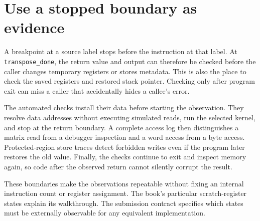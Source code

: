 \section{Use a stopped boundary as evidence}\label{transpose-p-boundaries}
A breakpoint at a source label stops before the instruction at that label. At
\texttt{transpose\_done}, the return value and output can therefore be checked
before the caller changes temporary registers or stores metadata. This is also
the place to check the saved registers and restored stack pointer. Checking only
after program exit can miss a caller that accidentally hides a callee's error.

The automated checks install their data before starting the observation. They
resolve data addresses without executing simulated reads, run the selected kernel,
and stop at the return boundary. A complete access log then distinguishes a
matrix read from a debugger inspection and a word access from a byte access.
Protected-region store traces detect forbidden writes even if the program later
restores the old value. Finally, the checks continue to exit and inspect memory
again, so code after the observed return cannot silently corrupt the result.

These boundaries make the observations repeatable without fixing an internal
instruction count or register assignment. The book's particular scratch-register
states explain its walkthrough. The submission contract specifies which states
must be externally observable for any equivalent implementation.
